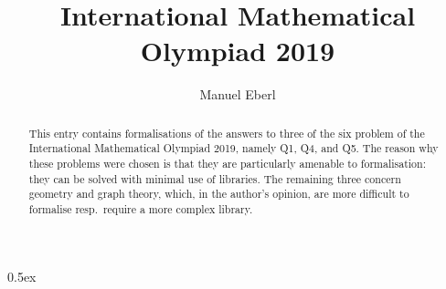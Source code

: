 \documentclass[11pt,a4paper]{article}
\begin{document}
\title{International Mathematical Olympiad 2019}
\author{Manuel Eberl}
\maketitle

\begin{abstract}
This entry contains formalisations of the answers to three of the six problem of the International Mathematical Olympiad 2019, namely Q1, Q4, and Q5.
The reason why these problems were chosen is that they are particularly amenable to formalisation: they can be solved with minimal use of libraries. The remaining three concern geometry and graph theory, which, in the author's opinion, are more difficult to formalise resp.\ require a more complex library.
\end{abstract}

\tableofcontents
\newpage
\parindent 0pt\parskip 0.5ex



\nocite{imo2019}


\end{document}
